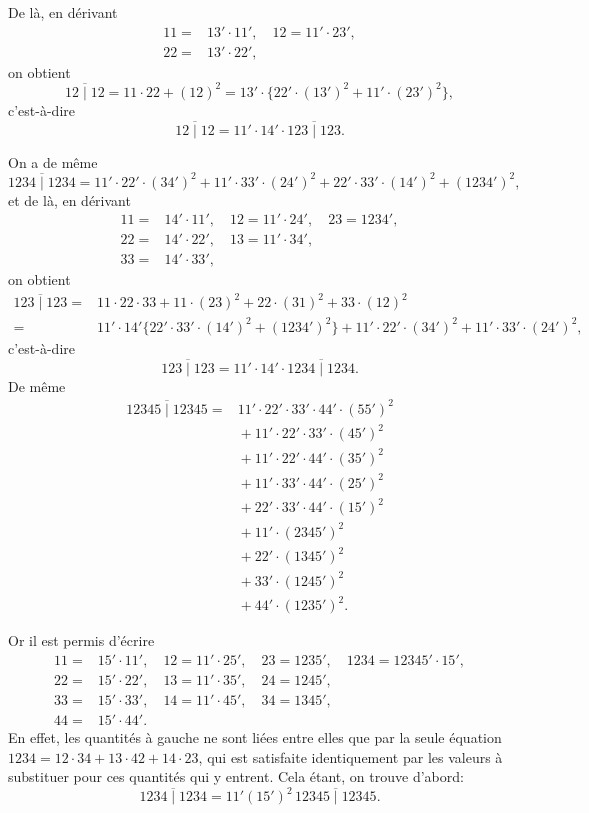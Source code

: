 \documentclass[11pt,a4paper]{article}
\begin{document}
\medskip

De l\`a, en d\'erivant
\begin{align*}
11 ={}& 13'\cdot 11',\quad 12 = 11'\cdot 23',\\
22 ={}& 13'\cdot 22',
\end{align*}
on obtient
\[
\overline{12 \mid 12} = 11\cdot 22 + (12)^2 = 13'\cdot\{22'\cdot(13')^2 + 11'\cdot(23')^2\},
\]
c'est-\`a-dire
\[
\overline{12 \mid 12} = 11'\cdot 14'\cdot\overline{123 \mid 123}.
\]

On a de m\^eme
\[
\overline{1234 \mid 1234} = 11'\cdot 22'\cdot(34')^2 + 11'\cdot 33'\cdot(24')^2 + 22'\cdot 33'\cdot(14')^2 + (1234')^2,
\]
et de l\`a, en d\'erivant
\begin{align*}
11 ={}& 14'\cdot 11',\quad 12 = 11'\cdot 24',\quad 23 = 1234',\\
22 ={}& 14'\cdot 22',\quad 13 = 11'\cdot 34',\\
33 ={}& 14'\cdot 33',
\end{align*}
on obtient
\begin{align*}
\overline{123 \mid 123} ={}& 11\cdot 22\cdot 33 + 11\cdot(23)^2 + 22\cdot(31)^2 + 33\cdot(12)^2\\
={}& 11'\cdot 14'\{22'\cdot 33'\cdot(14')^2 + (1234')^2\} + 11'\cdot 22'\cdot(34')^2 + 11'\cdot 33'\cdot(24')^2,
\end{align*}
c'est-\`a-dire
\[
\overline{123 \mid 123} = 11'\cdot 14'\cdot\overline{1234 \mid 1234}.
\]
De m\^eme
\begin{align*}
\overline{12345 \mid 12345} ={}& 11'\cdot 22'\cdot 33'\cdot 44'\cdot(55')^2\\
&{}+ 11'\cdot 22'\cdot 33'\cdot(45')^2\\
&{}+ 11'\cdot 22'\cdot 44'\cdot(35')^2\\
&{}+ 11'\cdot 33'\cdot 44'\cdot(25')^2\\
&{}+ 22'\cdot 33'\cdot 44'\cdot(15')^2\\
&{}+ 11'\cdot(2345')^2\\
&{}+ 22'\cdot(1345')^2\\
&{}+ 33'\cdot(1245')^2\\
&{}+ 44'\cdot(1235')^2.
\end{align*}

\medskip

Or il est permis d'\'ecrire
\begin{align*}
11 ={}& 15'\cdot 11',\quad 12 = 11'\cdot 25',\quad 23 = 1235',\quad 1234 = 12345'\cdot 15',\\
22 ={}& 15'\cdot 22',\quad 13 = 11'\cdot 35',\quad 24 = 1245',\\
33 ={}& 15'\cdot 33',\quad 14 = 11'\cdot 45',\quad 34 = 1345',\\
44 ={}& 15'\cdot 44'.
\end{align*}
En effet, les quantit\'es \`a gauche ne sont li\'ees entre elles que par la seule \'equation $1234 = 12\cdot 34 + 13\cdot 42 + 14\cdot 23$, qui est satisfaite identiquement par les valeurs \`a substituer pour ces quantit\'es qui y entrent. Cela \'etant, on trouve d'abord:
\[
\overline{1234 \mid 1234} = 11'(15')^2\,\overline{12345 \mid 12345}.
\]
\end{document}
